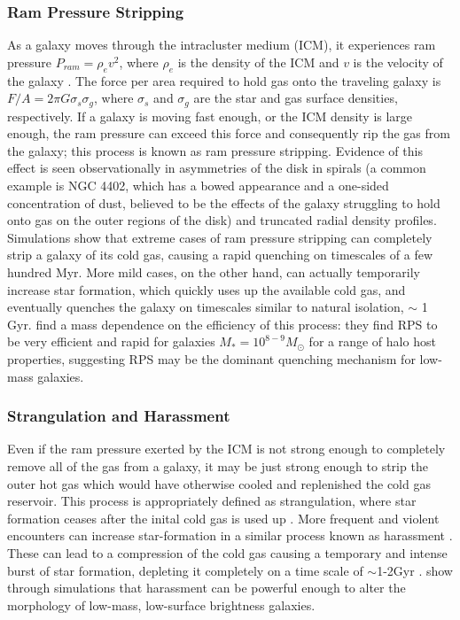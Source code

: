 \subsubsection{Ram Pressure Stripping}

As a galaxy moves through the intracluster medium (ICM), it experiences ram pressure $P_{ram} = \rho_e v^2$, where $\rho_e$ is the density of the ICM and $v$ is the velocity of the galaxy \citep{Gunn1972}. The force per area required to hold gas onto the traveling galaxy is $F/A = 2\pi G \sigma_{s} \sigma_{g}$, where $\sigma_{s}$ and $\sigma_{g}$ are the star and gas surface densities, respectively. If a galaxy is moving fast enough, or the ICM density is large enough, the ram pressure can exceed this force and consequently rip the gas from the galaxy; this process is known as ram pressure stripping. Evidence of this effect is seen observationally in asymmetries of the disk in spirals (a common example is NGC 4402, which has a bowed appearance and a one-sided concentration of dust, believed to be the effects of the galaxy struggling to hold onto gas on the outer regions of the disk) and truncated radial density profiles. Simulations \citep{Steinhauser2016} show that extreme cases of ram pressure stripping can completely strip a galaxy of its cold gas, causing a rapid quenching on timescales of a few hundred Myr. More mild cases, on the other hand, can actually temporarily increase star formation, which quickly uses up the available cold gas, and eventually quenches the galaxy on timescales similar to natural isolation, $\sim$ 1 Gyr. \citet{Fillingham2016} find a mass dependence on the efficiency of this process: they find RPS to be very efficient and rapid for galaxies $M_{*} = 10^{8-9}M_{\odot}$ for a range of halo host properties, suggesting RPS may be the dominant quenching mechanism for low-mass galaxies.  

\subsubsection{Strangulation and Harassment}

Even if the ram pressure exerted by the ICM is not strong enough to completely remove all of the gas from a galaxy, it may be just strong enough to strip the outer hot gas which would have otherwise cooled and replenished the cold gas reservoir. This process is appropriately defined as strangulation, where star formation ceases after the inital cold gas is used up \citep{Larson1980}. More frequent and violent encounters can increase star-formation in a similar process known as harassment \citep{Moore1996}. These can lead to a compression of the cold gas causing a temporary and intense burst of star formation, depleting it completely on a time scale of $\sim$1-2Gyr \citep{Kawata2007}. \citet{Moore1999} show through simulations that harassment can be powerful enough to alter the morphology of low-mass, low-surface brightness galaxies. 


